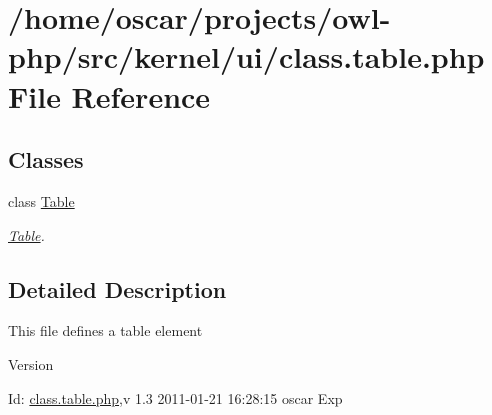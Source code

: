 \section{/home/oscar/projects/owl-\/php/src/kernel/ui/class.table.php File Reference}
\label{class_8table_8php}
\subsection*{Classes}
\begin{DoxyCompactItemize}
\item 
class \hyperlink{classTable}{Table}
\begin{DoxyCompactList}\small\item\em \hyperlink{classTable}{Table}. \item\end{DoxyCompactList}\end{DoxyCompactItemize}


\subsection{Detailed Description}
This file defines a table element \begin{DoxyVersion}{Version}

\end{DoxyVersion}
\begin{DoxyParagraph}{Id:}
\hyperlink{class_8table_8php}{class.table.php},v 1.3 2011-\/01-\/21 16:28:15 oscar Exp 
\end{DoxyParagraph}
